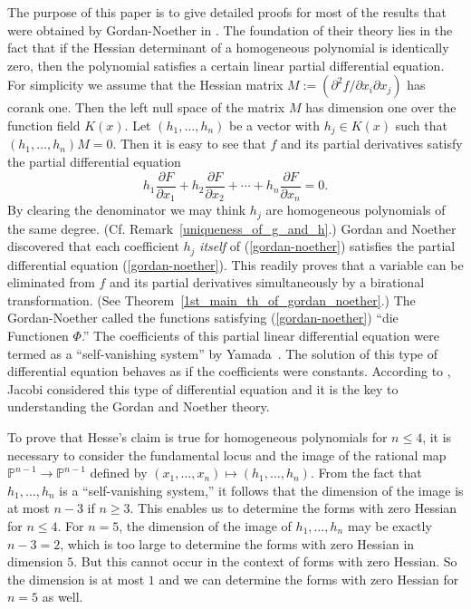 \documentclass[12pt]{article}
\theoremstyle{definition}
\theoremstyle{remark}
\def\pa{\partial}
\newcommand {\PP}{\mathbb{P}}
\begin{document}
The purpose of this paper is to give detailed proofs for most of the results that were obtained by 
Gordan-Noether in \cite{GNzzz}.  
The foundation of their theory lies in the fact that if the Hessian determinant of a homogeneous  polynomial is identically zero, then 
the polynomial satisfies a certain linear partial differential equation. 
For simplicity we  assume that the Hessian matrix $M:=(\pa ^2 f/\pa x_i \pa x_j)$ has corank one. 
Then the left null space of the matrix $M$ has dimension one over the function field $K(x)$. 
Let $(h_1, \ldots, h_n)$ be a vector with $h_j \in K(x)$ such that 
$(h_1, \ldots, h_n)M=0$.  Then it is easy to see that $f$ and its partial derivatives
satisfy the partial differential equation 
\begin{equation} \label{gordan-noether}
h_1\frac{\pa F}{\pa x_1} + h_2\frac{\pa F}{\pa x_2} + \cdots + h_n\frac{\pa F}{\pa x_n}=0. 
\end{equation} 
By clearing the denominator we may think $h_j$ are homogeneous polynomials of the same 
degree.  (Cf. Remark~\ref{uniqueness_of_g_and_h}.)   
Gordan and Noether discovered  that each coefficient $h_j$ {\it itself} of (\ref{gordan-noether}) 
satisfies the partial differential equation  (\ref{gordan-noether}). This readily proves that 
a variable can be eliminated from $f$ and its partial derivatives simultaneously by a birational 
transformation. (See Theorem~\ref{1st_main_th_of_gordan_noether}.) 
The Gordan-Noether called the functions satisfying  (\ref{gordan-noether}) ``die Functionen $\Phi$.''  
The coefficients of this partial linear differential equation 
were termed as a   
``self-vanishing system'' by Yamada~\cite{HY}.  
The solution of this type of  differential equation behaves 
as if the coefficients were constants.   
According to \cite{GNzzz}, Jacobi considered this type of differential equation and 
it is the key to understanding the Gordan and Noether theory.    

To prove that Hesse's claim is true for homogeneous polynomials for $n \leq 4$, 
it is necessary to consider the fundamental locus and the image of the rational map 
$\PP ^{n-1} \to \PP ^{n-1}$ defined by $ (x_1, \ldots, x_n) \mapsto (h_1, \ldots, h_n)$.   
From the fact that  $h_1, \ldots, h_n$ is a ``self-vanishing system,''  it follows that 
the dimension of the image is at most $n - 3$ if $n \ge 3$. This enables us to determine 
the forms with zero Hessian for $n \leq 4$. For $n = 5$, the dimension of the image
of $h_1, \ldots, h_n$ may be exactly $n - 3 = 2$, which is too large to determine 
the forms with zero Hessian in dimension $5$. But this cannot occur in the context of
forms with zero Hessian. So the dimension is at most $1$ and we can determine 
the forms with zero Hessian for $n = 5$ as well.
\end{document}
